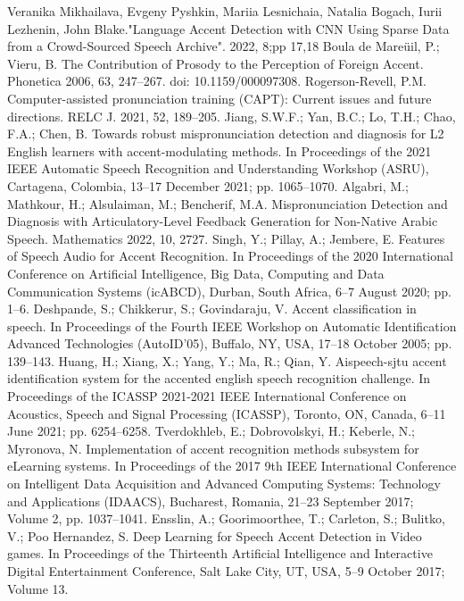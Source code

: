 \documentclass[ams]{U-AizuGT}
\begin{document}
\begin{thebibliography}{}
Veranika Mikhailava, Evgeny Pyshkin, Mariia Lesnichaia, Natalia Bogach, Iurii Lezhenin, John Blake."Language Accent Detection with CNN Using Sparse Data from a Crowd-Sourced Speech Archive". 2022, 8;pp 17,18
Boula de Mareüil, P.; Vieru, B. The Contribution of Prosody to the Perception of Foreign Accent. Phonetica 2006, 63, 247–267. doi: 10.1159/000097308.
Rogerson-Revell, P.M. Computer-assisted pronunciation training (CAPT): Current issues and future directions. RELC J. 2021, 52, 189–205.
Jiang, S.W.F.; Yan, B.C.; Lo, T.H.; Chao, F.A.; Chen, B. Towards robust mispronunciation detection and diagnosis for L2 English learners with accent-modulating methods. In Proceedings of the 2021 IEEE Automatic Speech Recognition and Understanding Workshop (ASRU), Cartagena, Colombia, 13–17 December 2021; pp. 1065–1070.
Algabri, M.; Mathkour, H.; Alsulaiman, M.; Bencherif, M.A. Mispronunciation Detection and Diagnosis with Articulatory-Level Feedback Generation for Non-Native Arabic Speech. Mathematics 2022, 10, 2727. 
Singh, Y.; Pillay, A.; Jembere, E. Features of Speech Audio for Accent Recognition. In Proceedings of the 2020 International Conference on Artificial Intelligence, Big Data, Computing and Data Communication Systems (icABCD), Durban, South Africa, 6–7 August 2020; pp. 1–6.
Deshpande, S.; Chikkerur, S.; Govindaraju, V. Accent classification in speech. In Proceedings of the Fourth IEEE Workshop on Automatic Identification Advanced Technologies (AutoID’05), Buffalo, NY, USA, 17–18 October 2005; pp. 139–143.
Huang, H.; Xiang, X.; Yang, Y.; Ma, R.; Qian, Y. Aispeech-sjtu accent identification system for the accented english speech recognition challenge. In Proceedings of the ICASSP 2021-2021 IEEE International Conference on Acoustics, Speech and Signal Processing (ICASSP), Toronto, ON, Canada, 6–11 June 2021; pp. 6254–6258.
Tverdokhleb, E.; Dobrovolskyi, H.; Keberle, N.; Myronova, N. Implementation of accent recognition methods subsystem for eLearning systems. In Proceedings of the 2017 9th IEEE International Conference on Intelligent Data Acquisition and Advanced Computing Systems: Technology and Applications (IDAACS), Bucharest, Romania, 21–23 September 2017; Volume 2, pp. 1037–1041.
Ensslin, A.; Goorimoorthee, T.; Carleton, S.; Bulitko, V.; Poo Hernandez, S. Deep Learning for Speech Accent Detection in Video games. In Proceedings of the Thirteenth Artificial Intelligence and Interactive Digital Entertainment Conference, Salt Lake City, UT, USA, 5–9 October 2017; Volume 13.

\end{thebibliography}
\end{document}
